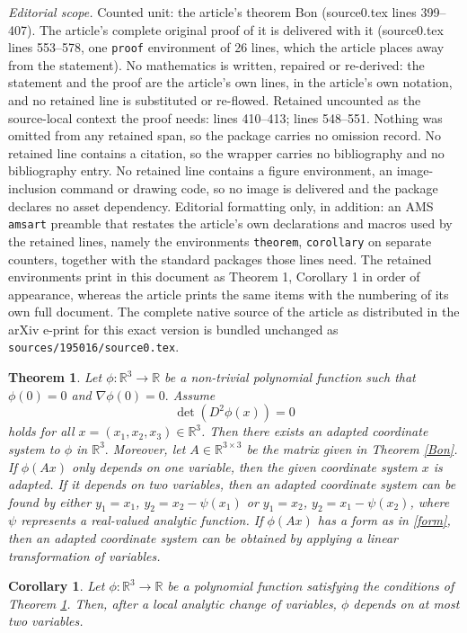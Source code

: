 \documentclass[10pt,a4paper]{amsart}
\newtheorem{theorem}{Theorem}
\newtheorem{corollary}{Corollary}
\begin{document}
\noindent\textit{Editorial scope.} Counted unit: the article's theorem Bon (source0.tex lines 399--407). The article's complete original proof of it is delivered with it (source0.tex lines 553--578, one \texttt{proof} environment of 26 lines, which the article places away from the statement). No mathematics is written, repaired or re-derived: the statement and the proof are the article's own lines, in the article's own notation, and no retained line is substituted or re-flowed.  Retained uncounted as the source-local context the proof needs: lines 410--413; lines 548--551.  Nothing was omitted from any retained span, so the package carries no omission record.  No retained line contains a citation, so the wrapper carries no bibliography and no bibliography entry.  No retained line contains a figure environment, an image-inclusion command or drawing code, so no image is delivered and the package declares no asset dependency.  Editorial formatting only, in addition: an AMS \texttt{amsart} preamble that restates the article's own declarations and macros used by the retained lines, namely the environments \texttt{theorem}, \texttt{corollary} on separate counters, together with the standard packages those lines need.  The retained environments print in this document as Theorem 1, Corollary 1 in order of appearance, whereas the article prints the same items with the numbering of its own full document.  The complete native source of the article as distributed in the arXiv e-print for this exact version is bundled unchanged as \texttt{sources/195016/source0.tex}.
\begin{theorem}\label{th:adap}
Let  $\phi:\mathbb{R}^3\to \mathbb{R}$ be a non-trivial polynomial function such that $\phi(0)=0$ and $\nabla \phi(0)=0.$  Assume $$\det{(D^2\phi(x))}=0$$
holds  for all $x=(x_1,x_2,x_3)\in \mathbb{R}^3$.   Then there exists an adapted coordinate system to $\phi$ in $\mathbb{R}^3.$ Moreover, let  $A\in \mathbb{R}^{3\times 3}$ be the matrix given in  Theorem \ref{Bon}. If $\phi(Ax)$ only depends on one variable, then the given coordinate  system $x$ is adapted. If it depends on two variables, then an adapted coordinate system can be found by either $y_1 = x_1$, $y_2 = x_2 - \psi(x_1)$ or $y_1 = x_2$, $y_2 = x_1 - \psi(x_2)$, where $\psi$ represents a real-valued analytic function. If $\phi(Ax)$ has a form as in \eqref{form}, then an adapted coordinate system can be obtained   by applying a linear transformation of variables.
\end{theorem}

\begin{corollary}\label{esseen}
Let  $\phi:\mathbb{R}^3\to \mathbb{R}$ be a  polynomial function  satisfying the conditions of Theorem   \ref{th:adap}.  Then, after  a
local analytic  change of variables,   $\phi$ depends on at most two variables.
\end{corollary}
\end{document}
